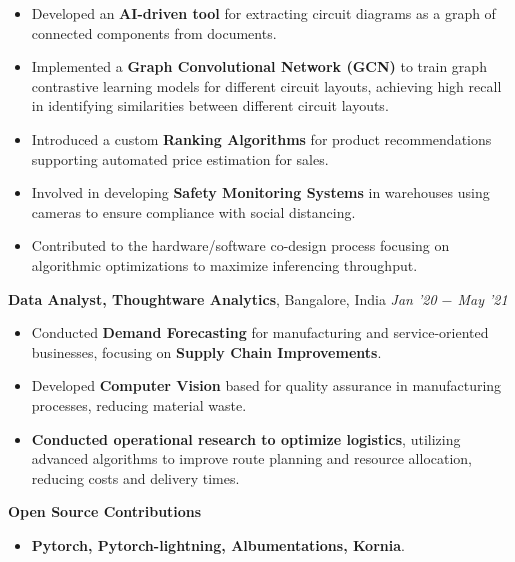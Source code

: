 \documentclass[10pt,a4]{article}
\begin{document}
{\begin{flushleft}
\begin{itemize}
        \item Developed an \textbf{AI-driven tool} for extracting circuit diagrams as a graph of connected components from documents.
        \item Implemented a \textbf{Graph Convolutional Network (GCN)} to train graph contrastive learning models for different circuit layouts, achieving high recall in identifying similarities between different circuit layouts.
        \item Introduced a custom \textbf{Ranking Algorithms} for product recommendations supporting automated price estimation for sales.
        \item Involved in developing \textbf{Safety Monitoring Systems} in warehouses using cameras to ensure compliance with social distancing.
        \item Contributed to the hardware/software co-design process focusing on algorithmic optimizations to maximize inferencing throughput.
    \end{itemize}		

    \vspace{0.5mm}
    \hspace{1.5mm} \textbf{\large Data Analyst, Thoughtware Analytics},  Bangalore, India \hfill \textit{\large Jan '20 $-$ May '21}	\\		
    \begin{itemize}
          
        \item Conducted \textbf{Demand Forecasting} for manufacturing and service-oriented businesses, focusing on \textbf{Supply Chain Improvements}.
        \item Developed \textbf{Computer Vision} based for quality assurance in manufacturing processes, reducing material waste.  
        \item \textbf{Conducted operational research to optimize logistics}, utilizing advanced algorithms to improve route planning and resource allocation, reducing costs and delivery times.
    \end{itemize}

    \vspace{1.0mm}
    \hspace{1.5mm} \textbf{\large Open Source Contributions}
    \begin{itemize}
        \item \textbf{Pytorch, Pytorch-lightning, Albumentations, Kornia}.
    \end{itemize}
\end{flushleft}




}
\end{document}
